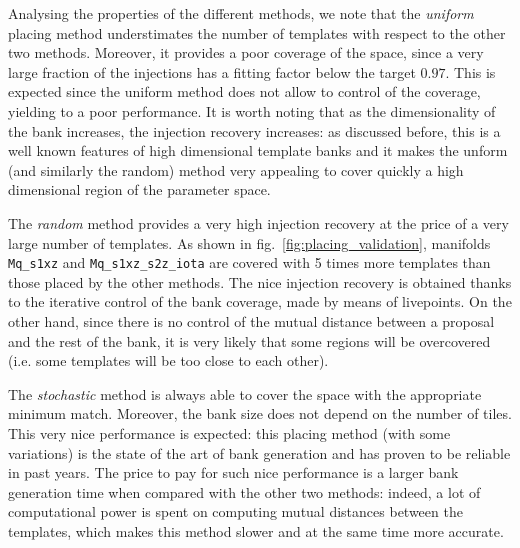\documentclass[twocolumn,showpacs,preprintnumbers,nofootinbib,prd,
superscriptaddress,10pt]{revtex4-2}
\begin{document}
Analysing the properties of the different methods, we note that the {\it uniform} placing method understimates the number of templates with respect to the other two methods. Moreover, it provides a poor coverage of the space, since a very large fraction of the injections has a fitting factor below the target $0.97$. This is expected since the uniform method does not allow to control of the coverage, yielding to a poor performance.
It is worth noting that as the dimensionality of the bank increases, the injection recovery increases: as discussed before, this is a well known features \cite{Messenger:2008ta, Allen:2021yuy, Allen:2022lqr} of high dimensional template banks and it makes the unform (and similarly the random) method very appealing to cover quickly a high dimensional region of the parameter space.

The {\it random} method provides a very high injection recovery at the price of a very large number of templates. As shown in fig.~\ref{fig:placing_validation}, manifolds \texttt{Mq\_s1xz} and \texttt{Mq\_s1xz\_s2z\_iota} are covered with 5 times more templates than those placed by the other methods.
The nice injection recovery is obtained thanks to the iterative control of the bank coverage, made by means of livepoints.
On the other hand, since there is no control of the mutual distance between a proposal and the rest of the bank, it is very likely that some regions will be overcovered (i.e. some templates will be too close to each other).

The {\it stochastic} method is always able to cover the space with the appropriate minimum match. Moreover, the bank size does not depend on the number of tiles. This very nice performance is expected: this placing method (with some variations) is the state of the art of bank generation and has proven to be reliable in past years.
The price to pay for such nice performance is a larger bank generation time when compared with the other two methods: indeed, a lot of computational power is spent on computing mutual distances between the templates, which makes this method slower and at the same time more accurate.
\end{document}
